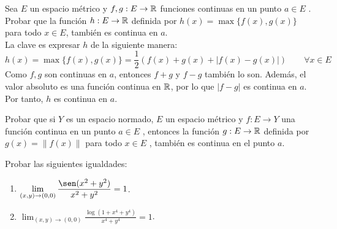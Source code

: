 \begin{ejercicio}
    Sea $E$ un espacio métrico y $f,g : E \to \mathbb{R}$ funciones continuas en un punto $a\in E$ . Probar que la función $h : E \to \mathbb{R}$ definida por $h(x) = \max \{f(x), g(x)\}$ para todo $x\in E$, también es continua en $a$.\\

    La clave es expresar $h$ de la siguiente manera:
    $$h(x)=\max\{f(x),g(x)\}=\frac{1}{2}\left(f(x)+g(x)+|f(x)-g(x)|\right) \qquad \forall x\in E$$
    Como $f,g$ son continuas en $a$, entonces $f+g$ y $f-g$ también lo son. Además, el valor absoluto es una función continua en $\mathbb{R}$,
    por lo que $|f-g|$ es continua en $a$. Por tanto, $h$ es continua en $a$.
\end{ejercicio}


\begin{ejercicio}
    Probar que si $Y$ es un espacio normado, $E$ un espacio métrico y $f:E \to Y$ una función continua en un punto $a \in E$ , entonces la función $g: E \to \mathbb{R}$ definida por $g(x)=\|f(x)\|$ para todo $x\in E$ , también es continua en el punto $a$.
\end{ejercicio}

\begin{ejercicio}
    Probar las siguientes igualdades:
    \begin{enumerate}
        \item $\displaystyle \lim_{(x,y)\to (0,0)} \frac{\sen(x^2 + y^2)}{x^2+y^2} = 1$.
        \item $\displaystyle \lim_{(x,y)\to (0,0)} \frac{\log(1+x^4 + y^4)}{x^4+y^4} = 1$.
    \end{enumerate}
\end{ejercicio}
